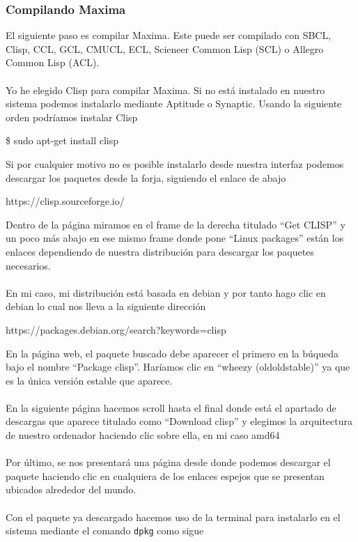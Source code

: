 \documentclass[a4paper, 12pt] {article}
\begin{document}
\subsubsection{Compilando Maxima}
El siguiente paso es compilar Maxima. Este puede ser compilado con SBCL, Clisp, CCL, GCL, CMUCL, ECL, Scieneer Common Lisp (SCL) o Allegro Common Lisp (ACL).\\\\
Yo he elegido Clisp para compilar Maxima. Si no está instalado en nuestro sistema podemos instalarlo mediante Aptitude o Synaptic. Usando la siguiente orden podríamos instalar Clisp
\begin{center}
\$ sudo apt-get install clisp
\end{center}
Si por cualquier motivo no es posible instalarlo desde nuestra interfaz podemos descargar los paquetes desde la forja, siguiendo el enlace de abajo
\begin{center}
  https://clisp.sourceforge.io/ 
\end{center}
Dentro de la página miramos en el frame de la derecha titulado ``Get CLISP'' y un poco más abajo en ese mismo frame donde pone ``Linux packages'' están los enlaces dependiendo de nuestra distribución para descargar los paquetes necesarios.\\\\
En mi caso, mi distribución está basada en debian y por tanto hago clic en debian lo cual nos lleva a la siguiente dirección
\begin{center}
  https://packages.debian.org/search?keywords=clisp
\end{center}
En la página web, el paquete buscado debe aparecer el primero en la búqueda bajo el nombre ``Package clisp''. Haríamos clic en ``wheezy (oldoldstable)'' ya que es la única versión estable que aparece.\\\\
En la siguiente página hacemos scroll hasta el final donde está el apartado de descargas que aparece titulado como ``Download clisp'' y elegimos la arquitectura de nuestro ordenador haciendo clic sobre ella, en mi caso amd64\\\\
Por último, se nos presentará una página desde donde podemos descargar el paquete haciendo clic en cualquiera de los enlaces espejos que se presentan ubicados alrededor del mundo.\\\\
Con el paquete ya descargado hacemos uso de la terminal para instalarlo en el sistema mediante el comando \texttt{dpkg} como sigue
\end{document}

